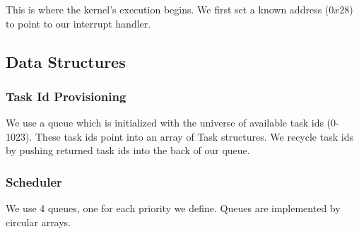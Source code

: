 \documentclass[letterpaper]{article}
\begin{document}
This is where the kernel's execution begins. We first set a known address ($0x28$) to point to our interrupt handler.

\subsection{Data Structures}

\subsubsection{Task Id Provisioning}
We use a queue which is initialized with the universe of available task ids (0-1023). These task ids point into an array
of Task structures. We recycle task ids by pushing returned task ids into the back of our queue.

\subsubsection{Scheduler}
We use 4 queues, one for each priority we define. Queues are implemented by circular arrays.
\end{document}

